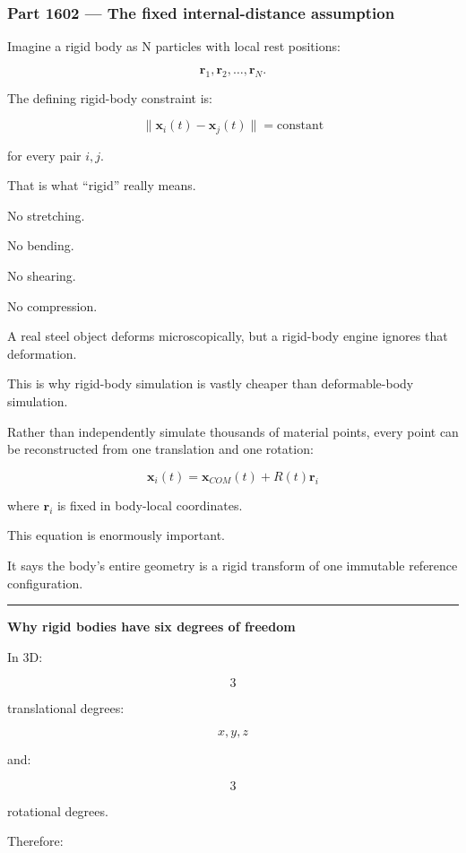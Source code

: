 \subsubsection{Part 1602 --- The fixed internal-distance assumption}\label{part-1602-the-fixed-internal-distance-assumption}

Imagine a rigid body as N particles with local rest positions:

\[
\mathbf{r}_1,\mathbf{r}_2,\dots,\mathbf{r}_N.
\]

The defining rigid-body constraint is:

\[
\boxed{
\|\mathbf{x}_i(t)-\mathbf{x}_j(t)\|
=
\text{constant}
}
\]

for every pair \(i,j\).

That is what ``rigid'' really means.

No stretching.

No bending.

No shearing.

No compression.

A real steel object deforms microscopically, but a rigid-body engine ignores that deformation.

This is why rigid-body simulation is vastly cheaper than deformable-body simulation.

Rather than independently simulate thousands of material points, every point can be reconstructed from one translation and one rotation:

\[
\boxed{
\mathbf{x}_i(t)
=
\mathbf{x}_{COM}(t)
+
R(t)\mathbf{r}_i
}
\]

where \(\mathbf{r}_i\) is fixed in body-local coordinates.

This equation is enormously important.

It says the body's entire geometry is a rigid transform of one immutable reference configuration.

\begin{center}\rule{0.5\linewidth}{0.5pt}\end{center}

\textbf{Why rigid bodies have six degrees of freedom}

In 3D:

\[
3
\]

translational degrees:

\[
x,y,z
\]

and:

\[
3
\]

rotational degrees.

Therefore:


